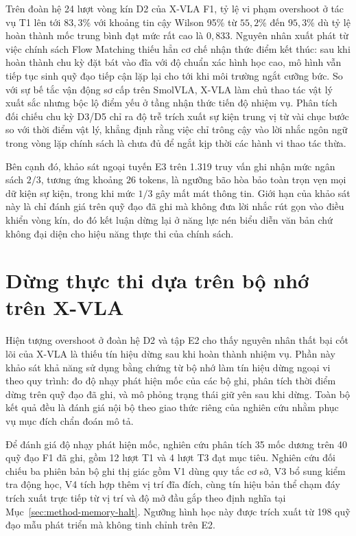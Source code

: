 Trên đoàn hệ 24 lượt vòng kín D2 của X-VLA F1, tỷ lệ vi phạm overshoot ở tác vụ T1 lên tới $83{,}3$\% với khoảng tin cậy Wilson 95\% từ $55{,}2$\% đến $95{,}3$\% dù tỷ lệ hoàn thành mốc trung bình đạt mức rất cao là $0{,}833$. Nguyên nhân xuất phát từ việc chính sách Flow Matching thiếu hẳn cơ chế nhận thức điểm kết thúc: sau khi hoàn thành chu kỳ đặt bát vào đĩa với độ chuẩn xác hình học cao, mô hình vẫn tiếp tục sinh quỹ đạo tiếp cận lặp lại cho tới khi môi trường ngắt cưỡng bức. So với sự bế tắc vận động sơ cấp trên SmolVLA, X-VLA làm chủ thao tác vật lý xuất sắc nhưng bộc lộ điểm yếu ở tầng nhận thức tiến độ nhiệm vụ. Phân tích đối chiếu chu kỳ D3/D5 chỉ ra độ trễ trích xuất sự kiện trung vị từ vài chục bước so với thời điểm vật lý, khẳng định rằng việc chỉ trông cậy vào lời nhắc ngôn ngữ trong vòng lặp chính sách là chưa đủ để ngắt kịp thời các hành vi thao tác thừa.

Bên cạnh đó, khảo sát ngoại tuyến E3 trên 1.319 truy vấn ghi nhận mức ngân sách $2/3$, tương ứng khoảng $26$ tokens, là ngưỡng bão hòa bảo toàn trọn vẹn mọi dữ kiện sự kiện, trong khi mức $1/3$ gây mất mát thông tin. Giới hạn của khảo sát này là chỉ đánh giá trên quỹ đạo đã ghi mà không đưa lời nhắc rút gọn vào điều khiển vòng kín, do đó kết luận dừng lại ở năng lực nén biểu diễn văn bản chứ không đại diện cho hiệu năng thực thi của chính sách.

\section{Dừng thực thi dựa trên bộ nhớ trên X-VLA}
\label{sec:memory-halt}

Hiện tượng overshoot ở đoàn hệ D2 và tập E2 cho thấy nguyên nhân thất bại cốt lõi của X-VLA là thiếu tín hiệu dừng sau khi hoàn thành nhiệm vụ. Phần này khảo sát khả năng sử dụng bằng chứng từ bộ nhớ làm tín hiệu dừng ngoại vi theo quy trình: đo độ nhạy phát hiện mốc của các bộ ghi, phân tích thời điểm dừng trên quỹ đạo đã ghi, và mô phỏng trạng thái giữ yên sau khi dừng. Toàn bộ kết quả đều là đánh giá nội bộ theo giao thức riêng của nghiên cứu nhằm phục vụ mục đích chẩn đoán mô tả.

\label{sec:writer-recall}
Để đánh giá độ nhạy phát hiện mốc, nghiên cứu phân tích 35 mốc dương trên 40 quỹ đạo F1 đã ghi, gồm 12 lượt T1 và 4 lượt T3 đạt mục tiêu. Nghiên cứu đối chiếu ba phiên bản bộ ghi thị giác gồm V1 dùng quy tắc cơ sở, V3 bổ sung kiểm tra động học, V4 tích hợp thêm vị trí đĩa đích, cùng tín hiệu bản thể chạm đáy trích xuất trực tiếp từ vị trí và độ mở đầu gắp theo định nghĩa tại Mục~\ref{sec:method-memory-halt}. Ngưỡng hình học này được trích xuất từ 198 quỹ đạo mẫu phát triển mà không tinh chỉnh trên E2.

